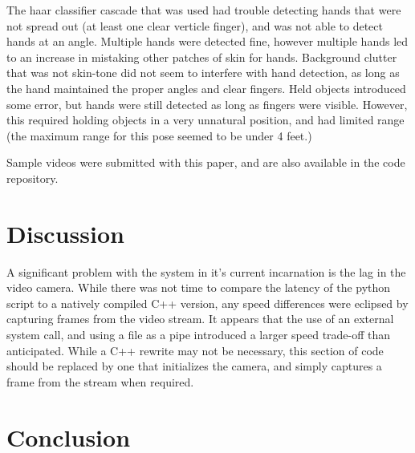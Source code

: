 \documentclass[12pt]{article}
\begin{document}
The haar classifier cascade that was used had trouble detecting hands that were not spread out (at least one clear verticle finger), and was not able to detect hands at an angle. Multiple hands were detected fine, however multiple hands led to an increase in mistaking other patches of skin for hands. Background clutter that was not skin-tone did not seem to interfere with hand detection, as long as the hand maintained the proper angles and clear fingers. Held objects introduced some error, but hands were still detected as long as fingers were visible. However, this required holding objects in a very unnatural position, and had limited range (the maximum range for this pose seemed to be under 4 feet.)

Sample videos were submitted with this paper, and are also available in the code repository\cite{google-code}.

\section{Discussion}
A significant problem with the system in it's current incarnation is the lag in the video camera. While there was not time to compare the latency of the python script to a natively compiled C++ version, any speed differences were eclipsed by capturing frames from the video stream. It appears that the use of an external system call, and using a file as a pipe introduced a larger speed trade-off than anticipated. While a C++ rewrite may not be necessary, this section of code should be replaced by one that initializes the camera, and simply captures a frame from the stream when required.



\section{Conclusion}




\end{document}
